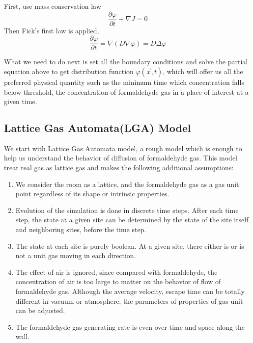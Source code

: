 \documentclass{mcmthesis}
\begin{document}
First, use mass conservation law
\begin{equation}
\frac{\partial\varphi}{\partial t}+\nabla J=0
\end{equation}
Then Fick's first law is applied,
\begin{equation}
\frac{\partial\varphi}{\partial t}=\nabla(D\nabla\varphi)=D\Delta\varphi
\end{equation}

What we need to do next is set all the boundary conditions and solve the partial equation above to get distribution function $\varphi(\vec{x},t)$, which will offer us all the preferred physical quantity such as the minimum time which concentration falls below threshold, the concentration of formaldehyde gas in a place of interest at a given time.


\subsection{Lattice Gas Automata(LGA) Model}

We start with Lattice Gas Automata model, a rough model which is enough to help us understand the behavior of diffusion of formaldehyde gas. This model treat real gas as lattice gas and makes the following additional assumptions:
\begin{enumerate}

\item We consider the room as a lattice, and the formaldehyde gas as a gas unit point regardless of its shape or intrinsic properties.

\item Evolution of the simulation is done in discrete time steps. After each time step, the state at a given site can be determined by the state of the site itself and neighboring sites, before the time step.

\item The state at each site is purely boolean. At a given site, there either is or is not a unit gas moving in each direction.

\item The effect of air is ignored, since compared with formaldehyde, the concentration of air is too large to matter on the behavior of flow of formaldehyde gas. Although the average velocity, escape time can be totally different in vacuum or atmosphere, the parameters of properties of gas unit can be adjusted.


\item The formaldehyde gas generating rate is even over time and space along the wall.

\end{enumerate}
\end{document}
